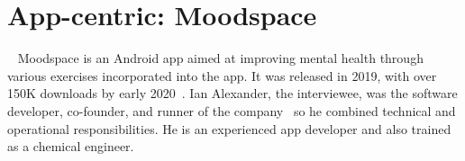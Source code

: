 \clearpage


\section{App-centric: Moodspace}~\label{case-study-overview-moodspace} %
Moodspace is an Android app aimed at improving mental health through various exercises incorporated into the app. %
It was released in 2019, with over 150K downloads by early 2020~\citep{objectbox2020_moodspace_interview}. Ian Alexander, the interviewee, was the software developer, co-founder, and runner of the company~\citep{objectbox2020_moodspace_interview} so he combined technical and operational responsibilities. He is an experienced app developer and also trained as a chemical engineer.

